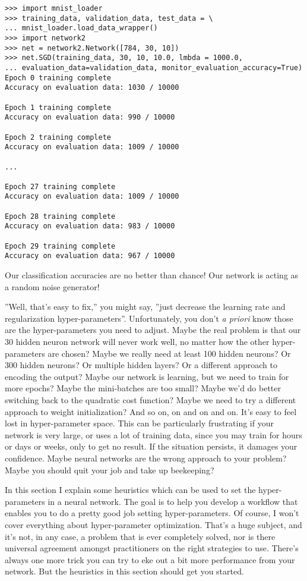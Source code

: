 \begin{lstlisting}
>>> import mnist_loader
>>> training_data, validation_data, test_data = \
... mnist_loader.load_data_wrapper()
>>> import network2
>>> net = network2.Network([784, 30, 10])
>>> net.SGD(training_data, 30, 10, 10.0, lmbda = 1000.0,
... evaluation_data=validation_data, monitor_evaluation_accuracy=True)
Epoch 0 training complete
Accuracy on evaluation data: 1030 / 10000

Epoch 1 training complete
Accuracy on evaluation data: 990 / 10000

Epoch 2 training complete
Accuracy on evaluation data: 1009 / 10000

...

Epoch 27 training complete
Accuracy on evaluation data: 1009 / 10000

Epoch 28 training complete
Accuracy on evaluation data: 983 / 10000

Epoch 29 training complete
Accuracy on evaluation data: 967 / 10000
\end{lstlisting}

Our classification accuracies are no better than chance! Our network is acting as a random noise generator!

''Well, that's easy to fix,'' you might say, ''just decrease the learning rate and regularization hyper-parameters''. Unfortunately, you don't \textit{a priori} know those are the hyper-parameters you need to adjust. Maybe the real problem is that our 30 hidden neuron network will never work well, no matter how the other hyper-parameters are chosen? Maybe we really need at least 100 hidden neurons? Or 300 hidden neurons? Or multiple hidden layers? Or a different approach to encoding the output? Maybe our network is learning, but we need to train for more epochs? Maybe the mini-batches are too small? Maybe we'd do better switching back to the quadratic cost function? Maybe we need to try a different approach to weight initialization? And so on, on and on and on. It's easy to feel lost in hyper-parameter space. This can be particularly frustrating if your network is very large, or uses a lot of training data, since you may train for hours or days or weeks, only to get no result. If the situation persists, it damages your confidence. Maybe neural networks are the wrong approach to your problem? Maybe you should quit your job and take up beekeeping?

In this section I explain some heuristics which can be used to set the hyper-parameters in a neural network. The goal is to help you develop a workflow that enables you to do a pretty good job setting hyper-parameters. Of course, I won't cover everything about hyper-parameter optimization. That's a huge subject, and it's not, in any case, a problem that is ever completely solved, nor is there universal agreement amongst practitioners on the right strategies to use. There's always one more trick you can try to eke out a bit more performance from your network. But the heuristics in this section should get you started.

